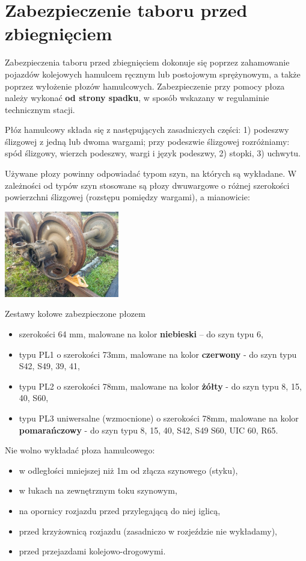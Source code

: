 \chapter{Zabezpieczenie taboru przed zbiegnięciem}

Zabezpieczenia taboru przed zbiegnięciem dokonuje się poprzez zahamowanie pojazdów kolejowych hamulcem ręcznym lub postojowym sprężynowym, a także poprzez wyłożenie płozów hamulcowych. Zabezpieczenie przy pomocy płoza należy wykonać \textbf{od strony spadku}, w sposób wskazany w regulaminie technicznym stacji.

Płóz hamulcowy składa się z następujących zasadniczych części:
1) podeszwy ślizgowej z jedną lub dwoma wargami; przy podeszwie ślizgowej rozróżniamy: spód ślizgowy, wierzch podeszwy, wargi i język podeszwy,
2) stopki,
3) uchwytu.

Używane płozy powinny odpowiadać typom szyn, na których są wykładane. W zależności od typów szyn stosowane są płozy dwuwargowe o różnej szerokości powierzchni ślizgowej (rozstępu pomiędzy wargami), a mianowicie:
\begin{marginfigure}
	\includegraphics[width=5cm]{skryptkierownik-img/ploz.jpg}
	\caption{Zestawy kołowe zabezpieczone płozem}
\end{marginfigure}

\begin{itemize}
	\item szerokości 64 mm, malowane na kolor \textbf{niebieski} – do szyn typu 6,
	\item typu PL1 o szerokości 73mm, malowane na kolor \textbf{czerwony} - do szyn typu S42, S49, 39, 41,
	\item typu PL2 o szerokości 78mm, malowane na kolor \textbf{żółty} - do szyn typu 8, 15, 40, S60,
	\item typu PL3 uniwersalne (wzmocnione) o szerokości 78mm, malowane na kolor \textbf{pomarańczowy} - do szyn typu 8, 15, 40, S42, S49 S60, UIC
	60, R65.
\end{itemize}

Nie wolno wykładać płoza hamulcowego:
\begin{itemize}
	\item w odległości mniejszej niż 1m od złącza szynowego (styku),
	\item w łukach na zewnętrznym toku szynowym,
	\item na opornicy rozjazdu przed przylegającą do niej iglicą,
	\item przed krzyżownicą rozjazdu (zasadniczo w rozjeździe nie wykładamy),
	\item przed przejazdami kolejowo-drogowymi.
\end{itemize} 
